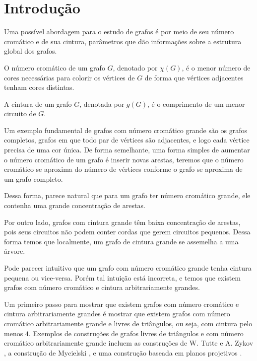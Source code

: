 \chapter{Introdução}
\label{cap:introducao}

Uma possível abordagem para o estudo de grafos é por meio de seu número cromático e de sua cintura, parâmetros que dão informações sobre a estrutura global dos grafos.

\begin{definicao}
O número cromático de um grafo $G$, denotado por $\chi(G)$, é o menor número de cores necessárias para colorir os vértices de $G$ de forma que vértices adjacentes tenham cores distintas.
\end{definicao}

\begin{definicao}
A cintura de um grafo $G$, denotada por $g(G)$, é o comprimento de um menor circuito de $G$.
\end{definicao}

Um exemplo fundamental de grafos com número cromático grande são os grafos completos, grafos em que todo par de vértices são adjacentes, e logo cada vértice precisa de uma cor única. De forma semelhante, uma forma simples de aumentar o número cromático de um grafo é inserir novas arestas, teremos que o número cromático se aproxima do número de vértices conforme o grafo se aproxima de um grafo completo.

Dessa forma, parece natural que para um grafo ter número cromático grande, ele contenha uma grande concentração de arestas.

Por outro lado, grafos com cintura grande têm baixa concentração de arestas, pois seus circuitos não podem conter cordas que gerem circuitos pequenos. Dessa forma temos que localmente, um grafo de cintura grande se assemelha a uma árvore.

Pode parecer intuitivo que um grafo com número cromático grande tenha cintura pequena ou vice-versa. Porém tal intuição está incorreta, e temos que existem grafos com número cromático e cintura arbitrariamente grandes.

Um primeiro passo para mostrar que existem grafos com número cromático e cintura arbitrariamente grandes é mostrar que existem grafos com número cromático arbitrariamente grande e livres de triângulos, ou seja, com cintura pelo menos $4$. Exemplos de construções de grafos livres de triângulos e com número cromático arbitrariamente grande incluem as construções de W. Tutte \cite{descartes1947three} e A. Zykov \cite{zykov1949some}, a construção de Mycielski \cite{mycielski1955coloriage}, e uma construção baseada em planos projetivos \cite{codenotti2000some}.

